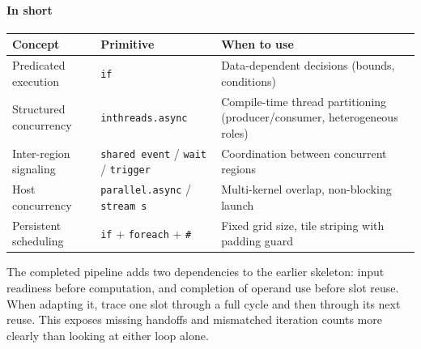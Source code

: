 \paragraph*{In short}

\begin{table}[htbp]
\centering\small
\begin{tabularx}{\linewidth}{@{}lXX@{}}
\toprule
\textbf{Concept} & \textbf{Primitive} & \textbf{When to use} \\
\midrule
Predicated execution & \texttt{if} & Data-dependent decisions (bounds, conditions) \\
Structured concurrency & \texttt{inthreads.\allowbreak{}async} & Compile-time thread partitioning (producer/consumer, heterogeneous roles) \\
Inter-region signaling & \texttt{shared event} / \texttt{wait} / \texttt{trigger} & Coordination between concurrent regions \\
Host concurrency & \texttt{parallel.async} / \texttt{stream s} & Multi-kernel overlap, non-blocking launch \\
Persistent scheduling & \texttt{if} + \texttt{foreach} + \texttt{\#} & Fixed grid size, tile striping with padding guard \\
\bottomrule
\end{tabularx}
\end{table}

The completed pipeline adds two dependencies to the earlier skeleton: input readiness before computation, and completion of operand use before slot reuse. When adapting it, trace one slot through a full cycle and then through its next reuse. This exposes missing handoffs and mismatched iteration counts more clearly than looking at either loop alone.
